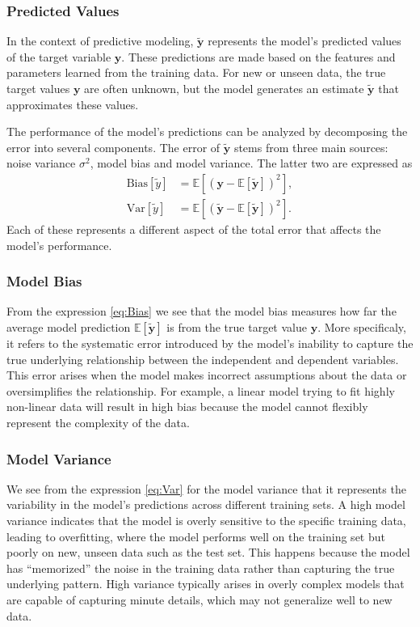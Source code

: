 \documentclass[aps,pra,english,notitlepage,reprint,nofootinbib]{revtex4-1}  %
\begin{document}
\subsubsection{Predicted Values}
In the context of predictive modeling, $\mathbf{\tilde{y}}$ represents the model's predicted values of the target variable $\mathbf{y}$. These predictions are made based on the features and parameters learned from the training data. For new or unseen data, the true target values $\mathbf{y}$ are often unknown, but the model generates an estimate $\mathbf{\tilde{y}}$ that approximates these values.

The performance of the model's predictions can be analyzed by decomposing the error into several components. The error of $\mathbf{\tilde{y}}$ stems from three main sources: noise variance $\sigma^2$, model bias and model variance. The latter two are expressed as
\begin{align}
  \text{Bias}\left[\tilde{y}\right] &= \mathbb{E}\left[\left(\mathbf{y}-\mathbb{E}\left[\mathbf{\tilde{y}}\right] \right)^2\right], \label{eq:Bias}
  \\
  \text{Var}\left[\tilde{y}\right] &= \mathbb{E}\left[\left(\mathbf{\tilde{y}}-\mathbb{E}\left[\mathbf{\tilde{y}}\right] \right)^2\right]. \label{eq:Var}
\end{align}
Each of these represents a different aspect of the total error that affects the model's performance.

\subsubsection{Model Bias}
From the expression \eqref{eq:Bias} we see that the model bias measures how far the average model prediction $\mathbb{E}[\mathbf{\tilde{y}}]$ is from the true target value $\mathbf{y}$. More specificaly, it refers to the systematic error introduced by the model's inability to capture the true underlying relationship between the independent and dependent variables. This error arises when the model makes incorrect assumptions about the data or oversimplifies the relationship. For example, a linear model trying to fit highly non-linear data will result in high bias because the model cannot flexibly represent the complexity of the data.

\subsubsection{Model Variance}
We see from the expression \eqref{eq:Var} for the model variance that it represents the variability in the model's predictions across different training sets. A high model variance indicates that the model is overly sensitive to the specific training data, leading to overfitting, where the model performs well on the training set but poorly on new, unseen data such as the test set. This happens because the model has ``memorized'' the noise in the training data rather than capturing the true underlying pattern. High variance typically arises in overly complex models that are capable of capturing minute details, which may not generalize well to new data.
\end{document}
